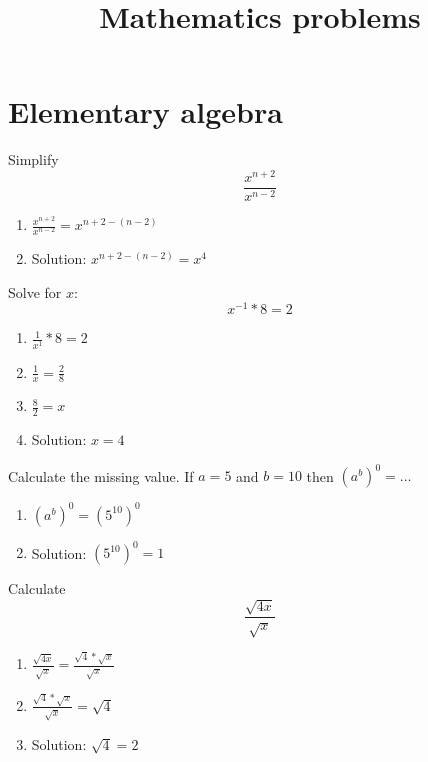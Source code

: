 \documentclass[10pt]{article}
\newenvironment{problem}[2][Problem]{\begin{trivlist}
\item[\hskip \labelsep {\bfseries #1}\hskip \labelsep {\bfseries #2.}]}{\end{trivlist}}
\begin{document}
 
\title{Mathematics problems}
\date{}
\maketitle

 \section{Elementary algebra}
 
\begin{problem}{1.1}
Simplify $$\frac{x^{n+2}}{x^{n-2}}$$
\begin{enumerate}
\item $\frac{x^{n+2}}{x^{n-2}} = x^{n+2-(n-2)}$
\item Solution: $x^{n+2-(n-2)} = x^{4}$
\end{enumerate}

\end{problem}

\begin{problem}{1.2}
Solve for $x$:
$$x^{-1}*8=2$$
\begin{enumerate}
\item $\frac{1}{x^{1}}*8 = 2$
\item $\frac{1}{x} = \frac{2}{8}$
\item $\frac{8}{2} = x$
\item Solution: $x = 4$
\end{enumerate}
\end{problem}

\begin{problem}{1.3}
Calculate the missing value. If $a=5$ and $b=10$ then $(a^b)^0=\dots$

\begin{enumerate}
\item $(a^b)^0 = (5^{10})^0$
\item Solution: $(5^{10})^0 = 1$
\end{enumerate}
\end{problem}

\begin{problem}{1.4}
Calculate
$$\frac{\sqrt{4x}}{\sqrt{x}}$$

\begin{enumerate}
\item $\frac{\sqrt{4x}}{\sqrt{x}} = \frac{\sqrt{4}*\sqrt{x}}{\sqrt{x}}$
\item $\frac{\sqrt{4}*\sqrt{x}}{\sqrt{x}} = \sqrt{4}$
\item Solution: $\sqrt{4} = 2$
\end{enumerate}
\end{problem}
\end{document}
